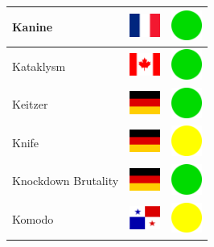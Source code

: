 \documentclass[12pt, a4paper, twoside]{report}
\begin{document}
\begin{center}
\begin{longtable}{|p{5cm}|p{2cm}|p{2cm}|}
Kanine & \includegraphics[width=1cm]{4x3/fr} & \includegraphics[width=1cm]{likes/y} \\ \hline
Kataklysm & \includegraphics[width=1cm]{4x3/ca} & \includegraphics[width=1cm]{likes/y} \\ \hline
Keitzer & \includegraphics[width=1cm]{4x3/de} & \includegraphics[width=1cm]{likes/y} \\ \hline
Knife & \includegraphics[width=1cm]{4x3/de} & \includegraphics[width=1cm]{likes/m} \\ \hline
Knockdown Brutality & \includegraphics[width=1cm]{4x3/de} & \includegraphics[width=1cm]{likes/y} \\ \hline
Komodo & \includegraphics[width=1cm]{4x3/pa} & \includegraphics[width=1cm]{likes/m} \\ \hline

\end{longtable}
\end{center}
\end{document}

